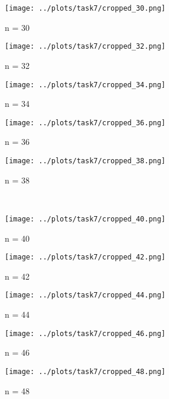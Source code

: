 \documentclass[a4paper,12pt]{article}
\begin{document}
	\begin{figure}[H] 
		\centering
		\captionsetup[subfigure]{labelformat=empty}
		\begin{subfigure}{0.19\textwidth}
			\centering 
			\texttt{[image: ../plots/task7/cropped\_30.png]}
			\caption{n = 30}
		\end{subfigure}
		\begin{subfigure}{0.19\textwidth}
			\centering 
			\texttt{[image: ../plots/task7/cropped\_32.png]}
			\caption{n = 32}
		\end{subfigure}
		\begin{subfigure}{0.19\textwidth}
			\centering 
			\texttt{[image: ../plots/task7/cropped\_34.png]}
			\caption{n = 34}
		\end{subfigure}
		\begin{subfigure}{0.19\textwidth}
			\centering 
			\texttt{[image: ../plots/task7/cropped\_36.png]}
			\caption{n = 36}
		\end{subfigure}
		\begin{subfigure}{0.19\textwidth}
			\centering 
			\texttt{[image: ../plots/task7/cropped\_38.png]}
			\caption{n = 38}
		\end{subfigure}
		\\ 
		\begin{subfigure}{0.19\textwidth}
			\centering 
			\texttt{[image: ../plots/task7/cropped\_40.png]}
			\caption{n = 40}
		\end{subfigure}
		\begin{subfigure}{0.19\textwidth}
			\centering 
			\texttt{[image: ../plots/task7/cropped\_42.png]}
			\caption{n = 42}
		\end{subfigure}
		\begin{subfigure}{0.19\textwidth}
			\centering 
			\texttt{[image: ../plots/task7/cropped\_44.png]}
			\caption{n = 44}
		\end{subfigure}
		\begin{subfigure}{0.19\textwidth}
			\centering 
			\texttt{[image: ../plots/task7/cropped\_46.png]}
			\caption{n = 46}
		\end{subfigure}
		\begin{subfigure}{0.19\textwidth}
			\centering 
			\texttt{[image: ../plots/task7/cropped\_48.png]}
			\caption{n = 48}
		\end{subfigure}
		\\ 
		\begin{subfigure}{0.19\textwidth}

\end{subfigure}
\end{figure}
\end{document}

